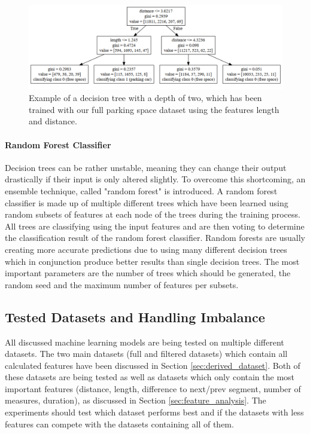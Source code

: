 \begin{figure}
	\centering
	\includegraphics[width=\textwidth]{img/decision_tree2.PNG}

	\caption{Example of a decision tree with a depth of two, which has been trained with our full parking space dataset using the features length and distance.}
	\label{fig:decision_tree}
\end{figure}





\paragraph{Random Forest Classifier}

Decision trees can be rather unstable, meaning they can change their output drastically if their input is only altered slightly. To overcome this shortcoming, an ensemble technique, called "random forest" is introduced. A random forest classifier is made up of multiple different trees which have been learned using random subsets of features at each node of the trees during the training process. All trees are classifying using the input features and are then voting to determine the classification result of the random forest classifier. Random forests are usually creating more accurate predictions due to using many different decision trees which in conjunction produce better results than single decision trees. The most important parameters are the number of trees which should be generated, the random seed and the maximum number of features per subsets.





\subsection{Tested Datasets and Handling Imbalance}
\label{sec:tested_datasets_and_handling_imbalance}

All discussed machine learning models are being tested on multiple different datasets. The two main datasets (full and filtered datasets) which contain all calculated features have been discussed in Section \ref{sec:derived_dataset}. Both of these datasets are being tested as well as datasets which only contain the most important features (distance, length, difference to next/prev segment, number of measures, duration), as discussed in Section \ref{sec:feature_analysis}. The experiments should test which dataset performs best and if the datasets with less features can compete with the datasets containing all of them.

